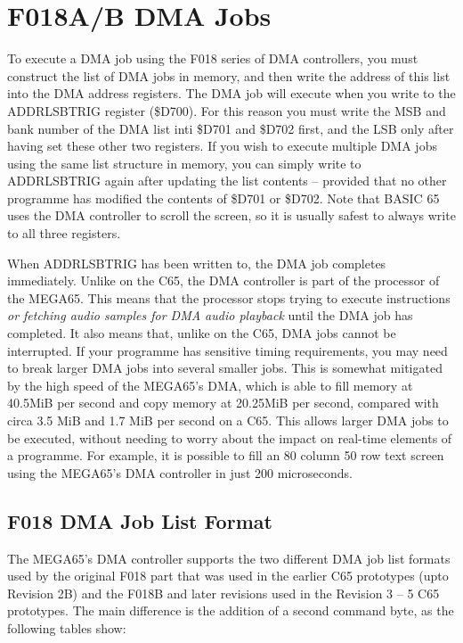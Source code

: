 \section{F018A/B DMA Jobs}

To execute a DMA job using the F018 series of DMA controllers, you must construct the list of DMA jobs in memory,
and then write the address of this list into the DMA address registers.  The DMA job will execute when you write to
the ADDRLSBTRIG register (\$D700).  For this reason you must write the MSB and bank number of the DMA list inti \$D701 and \$D702 first,
and the LSB only after having set these other two registers.  If you wish to execute multiple DMA jobs using the same
list structure in memory, you can simply write to ADDRLSBTRIG again after updating the list contents -- provided that
no other programme has modified the contents of \$D701 or \$D702.  Note that BASIC 65 uses the DMA controller to
scroll the screen, so it is usually safest to always write to all three registers.

When ADDRLSBTRIG has been written to, the DMA job completes immediately.  Unlike on the C65, the DMA controller is part
of the processor of the MEGA65. This means that the processor stops trying to execute instructions {\em or fetching audio samples for DMA audio playback} until the DMA job
has completed.  It also means that, unlike on the C65, DMA jobs cannot be interrupted. If your programme has sensitive timing
requirements, you may need to break larger DMA jobs into several smaller jobs.  This is somewhat mitigated by the high
speed of the MEGA65's DMA, which is able to fill memory at 40.5MiB per second and copy memory at 20.25MiB per second, compared
with circa 3.5 MiB and 1.7 MiB per second on a C65. This allows larger DMA jobs to be executed, without needing to worry about
the impact on real-time elements of a programme. For example, it is possible to fill an 80 column 50 row text screen using the
MEGA65's DMA controller in just 200 microseconds.

\subsection{F018 DMA Job List Format}

The MEGA65's DMA controller supports the two different DMA job list formats used by the original F018 part that
was used in the earlier C65 prototypes (upto Revision 2B) and the F018B and later revisions used in the Revision 3 -- 5
C65 prototypes.  The main difference is the addition of a second command byte, as the following tables show:

